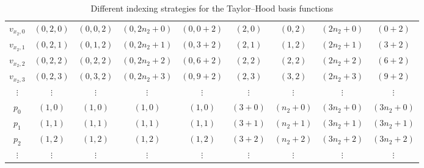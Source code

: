 \documentclass[a4paper,10pt,headings=normal,bibliography=totoc]{scrartcl}
\begin{document}
\begin{table}
{\begin{tabular}{c|c|c|c|c|c|c|c|c}
  $v_{x_2,0}$
    & $(0,2,0)$
    & $(0,0,2)$
    & $(0,2n_2+0)$
    & $(0,0+2)$
    & $(2,0)$
    & $(0,2)$
    & $(2n_2+0)$
    & $(0+2)$
    \\
  $v_{x_2,1}$
    & $(0,2,1)$
    & $(0,1,2)$
    & $(0,2n_2+1)$
    & $(0,3+2)$
    & $(2,1)$
    & $(1,2)$
    & $(2n_2+1)$
    & $(3+2)$
    \\
  $v_{x_2,2}$
    & $(0,2,2)$
    & $(0,2,2)$
    & $(0,2n_2+2)$
    & $(0,6+2)$
    & $(2,2)$
    & $(2,2)$
    & $(2n_2+2)$
    & $(6+2)$
    \\
  $v_{x_2,3}$
    & $(0,2,3)$
    & $(0,3,2)$
    & $(0,2n_2+3)$
    & $(0,9+2)$
    & $(2,3)$
    & $(3,2)$
    & $(2n_2+3)$
    & $(9+2)$
    \\
  $\vdots$ & $\vdots$ & $\vdots$ & $\vdots$ &  $\vdots$ & $\vdots$ & $\vdots$ & $\vdots$ & $\vdots$
  \\
  $p_{0}$
    & $(1,0)$
    & $(1,0)$
    & $(1,0)$
    & $(1,0)$
    & $(3+0)$
    & $(n_2+0)$
    & $(3n_2+0)$
    & $(3n_2+0)$
    \\
  $p_{1}$
    & $(1,1)$
    & $(1,1)$
    & $(1,1)$
    & $(1,1)$
    & $(3+1)$
    & $(n_2+1)$
    & $(3n_2+1)$
    & $(3n_2+1)$
    \\
  $p_{2}$
    & $(1,2)$
    & $(1,2)$
    & $(1,2)$
    & $(1,2)$
    & $(3+2)$
    & $(n_2+2)$
    & $(3n_2+2)$
    & $(3n_2+2)$
    \\
  $\vdots$ & $\vdots$ & $\vdots$ & $\vdots$ &  $\vdots$ & $\vdots$ & $\vdots$ & $\vdots$ & $\vdots$
  \\
  \hline
\end{tabular}
}
\caption{Different indexing strategies for the Taylor--Hood basis functions}
\label{tab:th_indexing_variants}
\end{table}
\end{document}
